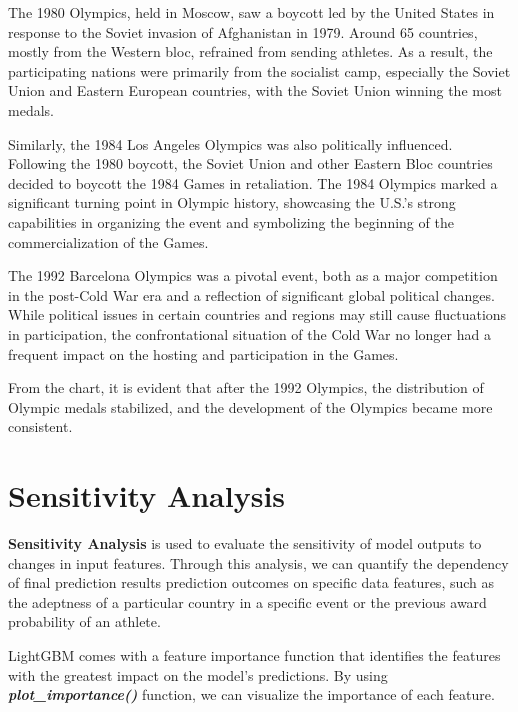 \documentclass[12pt]{article}  %
\begin{document}
The 1980 Olympics, held in Moscow, saw a boycott led by the United States in response to the Soviet invasion of Afghanistan in 1979. Around 65 countries, mostly from the Western bloc, refrained from sending athletes. As a result, the participating nations were primarily from the socialist camp, especially the Soviet Union and Eastern European countries, with the Soviet Union winning the most medals.

Similarly, the 1984 Los Angeles Olympics was also politically influenced. Following the 1980 boycott, the Soviet Union and other Eastern Bloc countries decided to boycott the 1984 Games in retaliation. The 1984 Olympics marked a significant turning point in Olympic history, showcasing the U.S.'s strong capabilities in organizing the event and symbolizing the beginning of the commercialization of the Games.

The 1992 Barcelona Olympics was a pivotal event, both as a major competition in the post-Cold War era and a reflection of significant global political changes. While political issues in certain countries and regions may still cause fluctuations in participation, the confrontational situation of the Cold War no longer had a frequent impact on the hosting and participation in the Games.

From the chart, it is evident that after the 1992 Olympics, the distribution of Olympic medals stabilized, and the development of the Olympics became more consistent.



\section{Sensitivity Analysis}

\textbf{Sensitivity Analysis} is used to evaluate the sensitivity of model outputs to changes in input features. Through this analysis, we can quantify the dependency of final prediction results prediction outcomes on specific data features, such as the adeptness of a particular country in a specific event or the previous award probability of an athlete.

LightGBM comes with a feature importance function that identifies the features with the greatest impact on the model’s predictions\cite{2}. By using \textbf{\textit{plot\_importance()}} function, we can visualize the importance of each feature.
\end{document}
